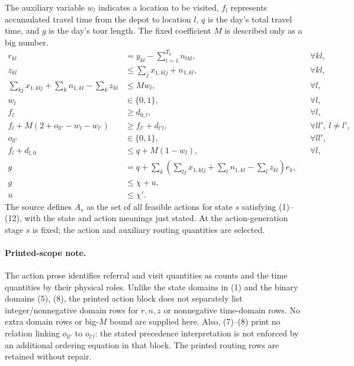 \documentclass{article}
\begin{document}
The auxiliary variable $w_l$ indicates a location to be visited, $f_l$ represents accumulated travel time from the depot to location $l$, $q$ is the day's total travel time, and $g$ is the day's tour length. The fixed coefficient $M$ is described only as a big number.
\begin{align}
r_{kl}&=y_{kl}-\sum_{t=1}^{T_k}n_{tkl},&&\forall kl,\tag{2}\\
z_{kl}&\leq\sum_jx_{1,klj}+n_{1,kl},&&\forall kl,\tag{3}\\
\sum_{kj}x_{1,klj}+\sum_kn_{1,kl}-\sum_kz_{kl}
&\leq Mw_l,&&\forall l,\tag{4}\\
w_l&\in\{0,1\},&&\forall l,\tag{5}\\
f_l&\geq d_{0,l},&&\forall l,\tag{6}\\
f_l+M(2+o_{ll'}-w_l-w_{l'})
&\geq f_{l'}+d_{l'l},&&\forall ll',\ l\neq l',\tag{7}\\
o_{ll'}&\in\{0,1\},&&\forall ll',\tag{8}\\
f_l+d_{l,0}&\leq q+M(1-w_l),&&\forall l,\tag{9}\\
g&=q+\sum_k\left(\sum_{lj}x_{1,klj}+\sum_ln_{1,kl}-\sum_lz_{kl}\right)e_k,\tag{10}\\
g&\leq\chi+u,\tag{11}\\
u&\leq\chi'.\tag{12}
\end{align}
The source defines $A_s$ as the set of all feasible actions for state $s$ satisfying (1)--(12), with the state and action meanings just stated. At the action-generation stage $s$ is fixed; the action and auxiliary routing quantities are selected.

\paragraph{Printed-scope note.}
The action prose identifies referral and visit quantities as counts and the time quantities by their physical roles. Unlike the state domains in (1) and the binary domains (5), (8), the printed action block does not separately list integer/nonnegative domain rows for $r,n,z$ or nonnegative time-domain rows. No extra domain rows or big-$M$ bound are supplied here. Also, (7)--(8) print no relation linking $o_{ll'}$ to $o_{l'l}$: the stated precedence interpretation is not enforced by an additional ordering equation in that block. The printed routing rows are retained without repair.
\end{document}

